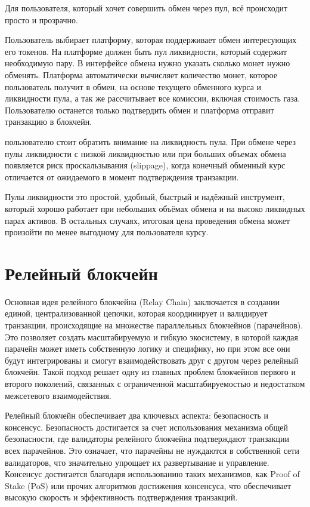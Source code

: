 Для пользователя, который хочет совершить обмен через пул, всё происходит просто и прозрачно.

Пользователь выбирает платформу, которая поддерживает обмен интересующих его токенов. На платформе должен быть пул ликвидности, который содержит необходимую пару. В интерфейсе обмена нужно указать сколько монет нужно обменять. Платформа автоматически вычисляет количество монет, которое пользователь получит в обмен, на основе текущего обменного курса и ликвидности пула, а так же рассчитывает все комиссии, включая стоимость газа. Пользователю останется только подтвердить обмен и платформа отправит транзакцию в блокчейн.

пользователю стоит обратить внимание на ликвидность пула. При обмене через пулы ликвидности с низкой ликвидностью или при больших объемах обмена появляется риск проскальзывания (slippage), когда конечный обменный курс отличается от ожидаемого в момент подтверждения транзакции.

Пулы ликвидности это простой, удобный, быстрый и надёжный инструмент, который хорошо работает при небольших объёмах обмена и на высоко ликвидных парах активов. В остальных случаях, итоговая цена проведения обмена может произойти по менее выгодному для пользователя курсу.

\section{Релейный блокчейн}

Основная идея релейного блокчейна (Relay Chain) заключается в создании единой, централизованной цепочки, которая координирует и валидирует транзакции, происходящие на множестве параллельных блокчейнов (парачейнов). Это позволяет создать масштабируемую и гибкую экосистему, в которой каждая парачейн может иметь собственную логику и специфику, но при этом все они будут интегрированы и смогут взаимодействовать друг с другом через релейный блокчейн. Такой подход решает одну из главных проблем блокчейнов первого и второго поколений, связанных с ограниченной масштабируемостью и недостатком межсетевого взаимодействия.

Релейный блокчейн обеспечивает два ключевых аспекта: безопасность и консенсус. Безопасность достигается за счет использования механизма общей безопасности, где валидаторы релейного блокчейна подтверждают транзакции всех парачейнов. Это означает, что парачейны не нуждаются в собственной сети валидаторов, что значительно упрощает их развертывание и управление. Консенсус достигается благодаря использованию таких механизмов, как Proof of Stake (PoS) или прочих алгоритмов достижения консенсуса, что обеспечивает высокую скорость и эффективность подтверждения транзакций.


